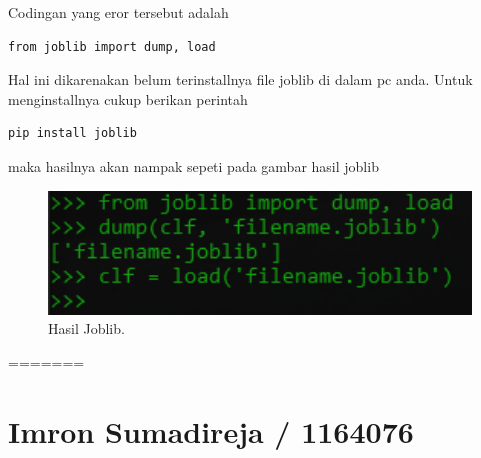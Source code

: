 \begin{enumerate}
\subitem
Codingan yang eror tersebut adalah
\begin{verbatim}
from joblib import dump, load
\end{verbatim}
\subitem
Hal ini dikarenakan belum terinstallnya file joblib di dalam pc anda. Untuk menginstallnya cukup berikan perintah
\begin{verbatim}
pip install joblib
\end{verbatim}

\subitem
maka hasilnya akan nampak sepeti pada gambar hasil joblib

\begin{figure}[ht]
\centerline{\includegraphics[width=1\textwidth]{figures/Hasil Joblib Y.PNG}}
\caption{Hasil Joblib.}
\end{figure}
\end{enumerate}






=======
\section{Imron Sumadireja / 1164076}
